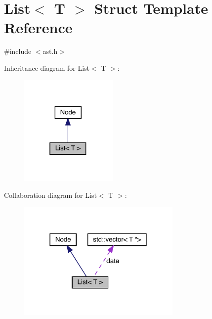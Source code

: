 \hypertarget{struct_list}{}\section{List$<$ T $>$ Struct Template Reference}
\label{struct_list}


{\ttfamily \#include $<$ast.\+h$>$}



Inheritance diagram for List$<$ T $>$\+:
\nopagebreak
\begin{figure}[H]
\begin{center}
\leavevmode
\includegraphics[width=135pt]{struct_list__inherit__graph}
\end{center}
\end{figure}


Collaboration diagram for List$<$ T $>$\+:
\nopagebreak
\begin{figure}[H]
\begin{center}
\leavevmode
\includegraphics[width=226pt]{struct_list__coll__graph}
\end{center}
\end{figure}
